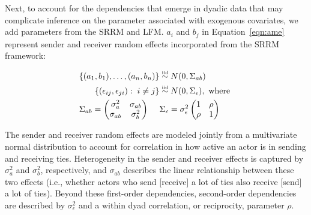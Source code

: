 \documentclass[12pt]{amsart}
\newcommand\simiid{\stackrel{\mathclap{\normalfont\mbox{\tiny{iid}}}}{\sim}}
\begin{document}
Next, to account for the dependencies that emerge in dyadic data that may complicate inference on the parameter associated with exogenous covariates, we add parameters from the SRRM and LFM. $a_{i}$ and $b_{j}$ in Equation~\ref{eqn:ame} represent sender and receiver random effects incorporated from the SRRM framework:

\begin{align}
	\begin{aligned}
		\{ (a_{1}, b_{1}), \ldots, (a_{n}, b_{n}) \} &\simiid N(0,\Sigma_{ab}) \\
		\{ (\epsilon_{ij}, \epsilon_{ji}) : \; i \neq j\} &\simiid N(0,\Sigma_{\epsilon}), \text{ where } \\
		\Sigma_{ab} = \begin{pmatrix} \sigma_{a}^{2} & \sigma_{ab} \\ \sigma_{ab} & \sigma_{b}^2   \end{pmatrix} \;\;\;\;\; &\Sigma_{\epsilon} = \sigma_{\epsilon}^{2} \begin{pmatrix} 1 & \rho \\ \rho & 1  \end{pmatrix}
	\label{eqn:srm}
	\end{aligned}
\end{align}

The sender and receiver random effects are modeled jointly from a multivariate normal distribution to account for correlation in how active an actor is in sending and receiving ties. Heterogeneity in the sender and receiver effects is captured by $\sigma_{a}^{2}$ and $\sigma_{b}^{2}$, respectively, and $\sigma_{ab}$ describes the linear relationship between these two effects (i.e., whether actors who send [receive] a lot of ties also receive [send] a lot of ties). Beyond these first-order dependencies, second-order dependencies are described by $\sigma_{\epsilon}^{2}$ and a within dyad correlation, or reciprocity, parameter $\rho$.
\end{document}

